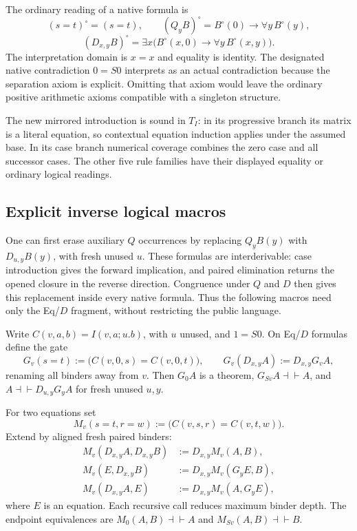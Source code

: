 The ordinary reading of a native formula is
\[
 (s=t)^\circ=(s=t),\qquad
 (Q_yB)^\circ=B^\circ(0)\to\forall y\,B^\circ(y),
\]
\[
 (D_{x,y}B)^\circ=
 \exists x\bigl(B^\circ(x,0)\to\forall y\,B^\circ(x,y)\bigr).
\]
The interpretation domain is $x=x$ and equality is identity.  The
designated native contradiction $0=S0$ interprets as an actual
contradiction because the separation axiom is explicit.  Omitting that
axiom would leave the ordinary positive arithmetic axioms compatible
with a singleton structure.

The new mirrored introduction is sound in $T_I$: in its progressive
branch its matrix is a literal equation, so contextual equation
induction applies under the assumed base.  In its case branch numerical
coverage combines the zero case and all successor cases.  The other
five rule families have their displayed equality or ordinary logical
readings.

\subsection{Explicit inverse logical macros}\label{sec:choice-introduction}
One can first erase auxiliary $Q$ occurrences by replacing
$Q_yB(y)$ with $D_{u,y}B(y)$, with fresh unused $u$.  These formulas are
interderivable: case introduction gives the forward implication, and
paired elimination returns the opened closure in the reverse direction.
Congruence under $Q$ and $D$ then gives this replacement inside every
native formula.  Thus the following macros need only the Eq/$D$
fragment, without restricting the public language.

Write $C(v,a,b)=I(v,a;u.b)$, with $u$ unused, and $1=S0$.  On Eq/$D$
formulas define the gate
\[
 G_v(s=t):=\bigl(C(v,0,s)=C(v,0,t)\bigr),\qquad
 G_v(D_{x,y}A):=D_{x,y}G_vA,
\]
renaming all binders away from $v$.  Then $G_0A$ is a theorem,
$G_{Sv}A\dashv\vdash A$, and
$A\dashv\vdash D_{u,y}G_yA$ for fresh unused $u,y$.

For two equations set
\[
 M_v(s=t,r=w):=\bigl(C(v,s,r)=C(v,t,w)\bigr).
\]
Extend by aligned fresh paired binders:
\[
\begin{aligned}
 M_v(D_{x,y}A,D_{x,y}B)&:=D_{x,y}M_v(A,B),\\
 M_v(E,D_{x,y}B)&:=D_{x,y}M_v(G_yE,B),\\
 M_v(D_{x,y}A,E)&:=D_{x,y}M_v(A,G_yE),
\end{aligned}
\]
where $E$ is an equation.  Each recursive call reduces maximum binder
depth.  The endpoint equivalences are
$M_0(A,B)\dashv\vdash A$ and $M_{Sv}(A,B)\dashv\vdash B$.


